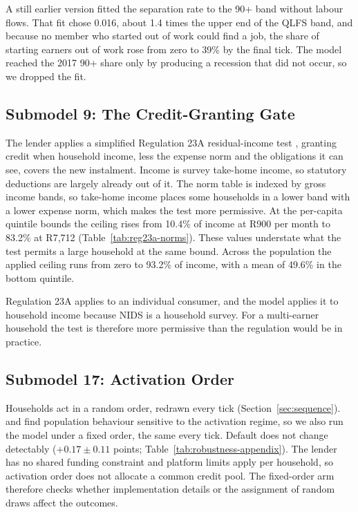 A still earlier version fitted the separation rate to the 90+ band without labour flows. That
fit chose 0.016, about 1.4 times the upper end of the \ac{QLFS} band, and because no member who
started out of work could find a job, the share of starting earners out of work rose from zero
to 39\% by the final tick. The model reached the 2017 90+ share only by producing a
recession that did not occur, so we dropped the fit.

\subsection{Submodel 9: The Credit-Granting Gate}
\label{app:gate}

The lender applies a simplified Regulation 23A residual-income test
\citep{sa_ncr_affordability_2015}, granting credit when household income, less the expense norm
and the obligations it can see, covers the new instalment.
Income is survey take-home income, so statutory deductions are largely already out of it. The
norm table is indexed by gross income bands, so take-home income places some households in a
lower band with a lower expense norm, which makes the test more permissive. At the per-capita
quintile bounds the ceiling rises from 10.4\% of income at R900 per month to 83.2\% at R7{,}712
(Table~\ref{tab:reg23a-norms}). These values understate what the test permits a large household
at the same bound. Across the population the applied ceiling runs from zero to 93.2\% of income,
with a mean of 49.6\% in the bottom quintile.

Regulation 23A applies to an individual consumer, and the model applies it to household income
because \ac{NIDS} is a household survey. For a multi-earner household the test is therefore more
permissive than the regulation would be in practice.

\subsection{Submodel 17: Activation Order}
\label{app:activation}

Households act in a random order, redrawn every tick (Section~\ref{sec:sequence}).
\citet{comer2013activation} and \citet{alizadeh2015activation} find population behaviour
sensitive to the activation regime, so we also run the model under a fixed order, the same every
tick. Default does not change detectably ($+0.17 \pm 0.11$ points;
Table~\ref{tab:robustness-appendix}). The lender has no shared funding constraint and platform
limits apply per household, so activation order does not allocate a common credit pool. The
fixed-order arm therefore checks whether implementation details or the assignment of random
draws affect the outcomes.

